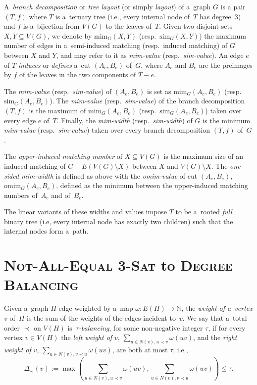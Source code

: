 \documentclass[a4paper,UKenglish,cleveref,hyperref,autoref]{lipics-v2021}
\renewcommand{\leq}{\leqslant}
\renewcommand{\le}{\leq}
\newcommand{\Nn}{\mathbb{N}}
\newcommand{\mim}{\text{mim}}
\newcommand{\ssim}{\text{sim}}
\newcommand{\omim}{\text{omim}}
\newcommand{\weight}{\omega}
\begin{document}
A~\emph{branch decomposition} or \emph{tree layout} (or simply \emph{layout}) of a~graph $G$ is a pair $(T, f)$ where $T$ is a~ternary tree (i.e., every internal node of~$T$ has degree~3) and $f$ is a~bijection from $V(G)$ to the leaves of~$T$.
Given two disjoint sets $X, Y \subseteq V(G)$, we denote by $\mim_G(X,Y)$ (resp.~$\ssim_G(X,Y)$) the maximum number of edges in a~semi-induced matching (resp.~induced matching) of $G$ between $X$ and $Y$, and may refer to it as \emph{mim-value} (resp.~\emph{sim-value}).
An edge $e$ of $T$ \emph{induces} or \emph{defines} a~cut $(A_e, B_e)$ of~$G$, where $A_e$ and $B_e$ are the preimages by $f$ of the leaves in the two components of $T-e$.

The \emph{mim-value} (resp.~\emph{sim-value}) of $(A_e, B_e)$ is set as $\mim_G(A_e,B_e)$ (resp.~$\ssim_G(A_e,B_e)$).
The \emph{mim-value} (resp.~\emph{sim-value}) of the branch decomposition $(T, f)$ is the maximum of $\mim_G(A_e,B_e)$ (resp.~$\ssim_G(A_e,B_e)$) taken over every edge $e$ of~$T$.
Finally, the \emph{mim-width} (resp.~\emph{sim-width}) of $G$ is the minimum \emph{mim-value} (resp.~\emph{sim-value}) taken over every branch decomposition $(T, f)$ of~$G$.

The \emph{upper-induced matching number} of $X \subseteq V(G)$ is the maximum size of an induced matching of $G - E(V(G) \setminus X)$ between $X$ and $V(G) \setminus X$.
The \emph{one-sided mim-width} is defined as above with the \emph{omim-value} of cut $(A_e, B_e)$, $\omim_G(A_e,B_e)$, defined as the minimum between the upper-induced matching numbers of~$A_e$ and of~$B_e$.

The linear variants of these widths and values impose $T$ to be a~rooted \emph{full} binary tree (i.e, every internal node has exactly two children) such that the internal nodes form a~path. 

\section{\textsc{Not-All-Equal 3-Sat} to \textsc{Degree Balancing}}

Given a~graph $H$ edge-weighted by a~map $\weight : E(H) \rightarrow \Nn$, the \emph{weight of a~vertex} $v$ of~$H$ is the sum of the weights of the edges incident to~$v$.
We say that a~total order $\prec$ on $V(H)$ is~\emph{$\tau$-balancing}, for some non-negative integer $\tau$,
if for every vertex $v \in V(H)$ the \emph{left weight of $v$}, $\sum_{u \in N(v), u \prec v} \weight(uv)$, and the \emph{right weight of $v$}, $\sum_{u \in N(v), v \prec u} \weight(uv)$, are both at most $\tau$, i.e., 
\[
\Delta_\prec(v) := \max \left( \sum_{u \in N(v), u \prec v} \weight(uv),  \sum_{u \in N(v), v \prec u} \weight(uv)\right) \le \tau.
\]
\end{document}
